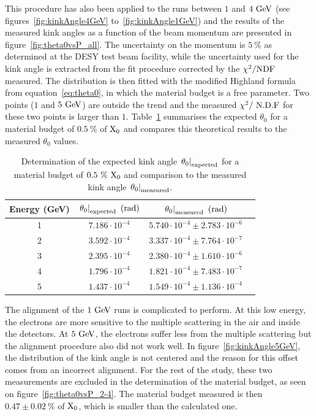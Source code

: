    This procedure has also been applied to the runs between $1$ and $4~\rm{GeV}$ (see figures~\ref{fig:kinkAngle4GeV} to~\ref{fig:kinkAngle1GeV}) and the results of the measured kink angles as a function of the beam momentum are presented in figure~\ref{fig:theta0vsP_all}. 
   The uncertainty on the momentum is $5~\%$ as determined at the DESY test beam facility, while the uncertainty used for the kink angle is extracted from the fit procedure corrected by the $\chi^2 / \rm{NDF}$ measured.
   The distribution is then fitted with the modified Highland formula from equation~\ref{eq:theta0}, in which the material budget is a free parameter.
   Two points ($1$ and $5~\rm{GeV}$) are outside the trend and the measured $\chi^2 /~\rm{N.D.F}$ for these two points is larger than $1$.
   Table~\ref{tab:theta0Calcultation} summarises the expected $\theta_0$ for a material budget of $0.5~\%$ of $\rm{X_0}$ and compares this theoretical results to the measured $\theta_0$ values.

   \begin{table}[!tbh]
     \centering
     \begin{tabular}{c c c c}
        \hline %
        Energy (GeV)	& $\left. \theta_0\right|_{\rm{expected}}~(\rm{rad})$ & $\left. \theta_0\right|_{\rm{measured}}~(\rm{rad})$ \tabularnewline
        \hline %
        \hline %

        	1	  &		$7.186 \cdot 10^{-4}$	  &		$5.740 \cdot 10^{-4} \pm 2.783 \cdot 10^{-6}$	      \tabularnewline
        	2		&		$3.592 \cdot 10^{-4}$	  &		$3.337 \cdot 10^{-4} \pm 7.764 \cdot 10^{-7}$	      \tabularnewline
        	3		&		$2.395 \cdot 10^{-4}$	  &		$2.380 \cdot 10^{-4} \pm 1.610 \cdot 10^{-6}$       \tabularnewline
        	4		&		$1.796 \cdot 10^{-4}$	  &	  $1.821 \cdot 10^{-4} \pm 7.483 \cdot 10^{-7}$       \tabularnewline
        	5		&		$1.437 \cdot 10^{-4}$   &		$1.549 \cdot 10^{-4} \pm 1.136 \cdot 10^{-4}$	      \tabularnewline
        \hline %
     
     \end{tabular}
     \caption{Determination of the expected kink angle $\left. \theta_0\right|_{\rm{expected}}$ for a material budget of $0.5~\%~\rm{X_0}$ and comparison to the measured kink angle $\left. \theta_0\right|_{\rm{measured}}$.}
     \label{tab:theta0Calcultation}
   \end{table}

   The alignment of the $1~\rm{GeV}$ runs is complicated to perform.
   At this low energy, the electrons are more sensitive to the multiple scattering in the air and inside the detectors.
   At $5~\rm{GeV}$, the electrons suffer less from the multiple scattering but the alignment procedure also did not work well. 
   In figure~\ref{fig:kinkAngle5GeV}, the distribution of the kink angle is not centered and the reason for this offset comes from an incorrect alignment.
   For the rest of the study, these two measurements are excluded in the determination of the material budget, as seen on figure~\ref{fig:theta0vsP_2-4}.
   The material budget measured is then $0.47 \pm 0.02~\%$ of $\rm{X_0}$, which is smaller than the calculated one.

